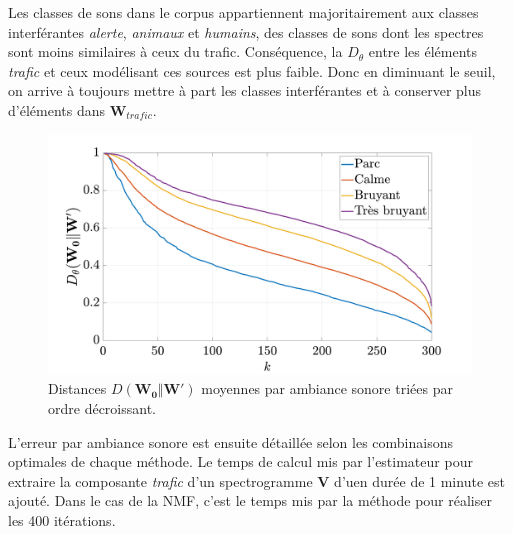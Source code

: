 Les classes de sons dans le corpus appartiennent majoritairement aux classes interférantes \textit{alerte}, \textit{animaux} et \textit{humains}, des classes de sons dont les spectres sont moins similaires à ceux du trafic. Conséquence, la $D_{\theta}$ entre les éléments \textit{trafic} et ceux modélisant ces sources est plus faible. Donc en diminuant le seuil, on arrive à toujours mettre à part les classes interférantes et à conserver plus d'éléments dans $\mathbf{W}_{trafic}$. 

\begin{figure}[h]
\centering
\includegraphics[width=.7\linewidth]{./figures/resultats/dist_grafic.pdf}
\caption{Distances $D(\mathbf{W_0}\Vert \mathbf{W'})$ moyennes par ambiance sonore triées par ordre décroissant.}
\label{fig:dist_grafic}
\end{figure}

L'erreur par ambiance sonore est ensuite détaillée selon les combinaisons optimales de chaque méthode. Le temps de calcul mis par l'estimateur pour extraire la composante \textit{trafic} d'un spectrogramme $\mathbf{V}$ d'uen durée de 1 minute est ajouté. Dans le cas de la NMF, c'est le temps mis par la méthode pour réaliser les 400 itérations.

